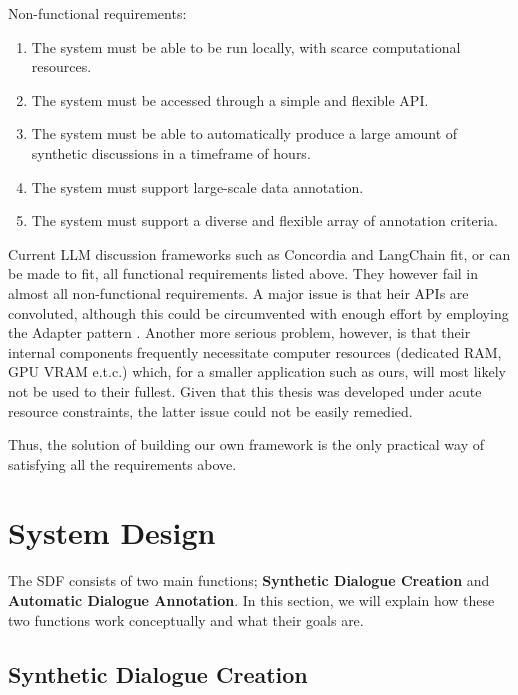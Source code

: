 Non-functional requirements:
\begin{enumerate}
	\item The system must be able to be run locally, with scarce computational resources.
	\item The system must be accessed through a simple and flexible \ac{API}.
	\item The system must be able to automatically produce a large amount of synthetic discussions in a timeframe of hours.
	\item The system must support large-scale data annotation.
	\item The system must support a diverse and flexible array of annotation criteria.
\end{enumerate}

Current LLM discussion frameworks such as Concordia \cite{Vezhnevets2023GenerativeAM} and LangChain \cite{langchain} fit, or can be made to fit, all functional requirements listed above. They however fail in almost all non-functional requirements. A major issue is that heir \acp{API} are convoluted, although this could be circumvented with enough effort by employing the Adapter pattern \cite{gamma1995design}. Another more serious problem, however, is that their internal components frequently necessitate computer resources (dedicated RAM, GPU VRAM e.t.c.) which, for a smaller application such as ours, will most likely not be used to their fullest. Given that this thesis was developed under acute resource constraints, the latter issue could not be easily remedied.

Thus, the solution of building our own framework is the only practical way of satisfying all the requirements above.



\section{System Design}
\label{sec:system:design-system}

The \ac{SDF} consists of two main functions; \textbf{Synthetic Dialogue Creation} and \textbf{Automatic Dialogue Annotation}. In this section, we will explain how these two functions work conceptually and what their goals are.


\subsection{Synthetic Dialogue Creation}
\label{ssec:system:creation}

